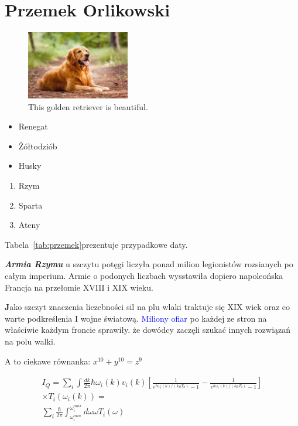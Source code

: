 \section{Przemek Orlikowski}
\label{sec:przorlik}


\begin{figure}[htbp] %
    \centering
    \includegraphics[width=0.4\textwidth]{pictures/pies-golden-retriever.jpg} %
    \caption{This golden retriever is beautiful.}
    \label{fig:dog}
\end{figure}

\begin{itemize}
  \item Renegat
  \item Żółtodziób 
  \item Husky
\end{itemize}

\begin{enumerate}
  \item Rzym
  \item Sparta
  \item Ateny
\end{enumerate}



Tabela~\ref{tab:przemek}prezentuje przypadkowe daty. %


\newpage


\textbf \textit{\Large{Armia Rzymu}} u szczytu potęgi liczyła ponad milion legionistów rozsianych po całym imperium. Armie o podonych liczbach wysstawiła dopiero napoleońska Francja na przełomie XVIII i XIX wieku. 
    
    \textbf Jako szczyt znaczenia liczebności sil na plu wlaki traktuje się XIX wiek oraz co warte podkreślenia I wojne światową. \textcolor{blue} {Miliony ofiar} po każdej ze stron na właściwie każdym froncie sprawiły. że dowódcy zaczęli szukać innych rozwiązań na polu walki.


A to ciekawe równanka:
$ x^{10} + y^{10} = z^9 $ \par
\begin{equation}
\begin{split}
I_Q = \sum_i \int \frac{dk}{2 \pi} \hbar \omega_i(k) v_i(k) \left[\frac{1}{e^{\hbar \omega_i(k) / (k_B T_h)} -1} - \frac{1}{e^{\hbar \omega_i(k) / (k_B T_c)} -1} \right] \\
\times T_{i}(\omega_i(k)) = \\
\sum_i \frac{\hbar}{2\pi} \int_{\omega_i^{min}}^{\omega_i^{max}} d\omega \omega T_{i}(\omega) 
\end{split}
\end{equation}
